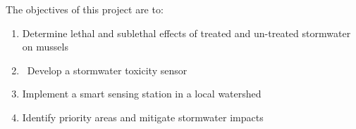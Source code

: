 The objectives of this project are to:

\begin{enumerate}
\tightlist
\item
  Determine lethal and sublethal effects of treated and un-treated
  stormwater on mussels
\item
  ~Develop a stormwater toxicity sensor
\item
  Implement a smart sensing station in a local watershed
\item
  Identify priority areas and mitigate stormwater impacts
\end{enumerate}